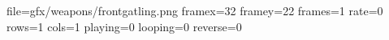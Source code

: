 file=gfx/weapons/frontgatling.png
framex=32
framey=22
frames=1
rate=0
rows=1
cols=1
playing=0
looping=0
reverse=0

